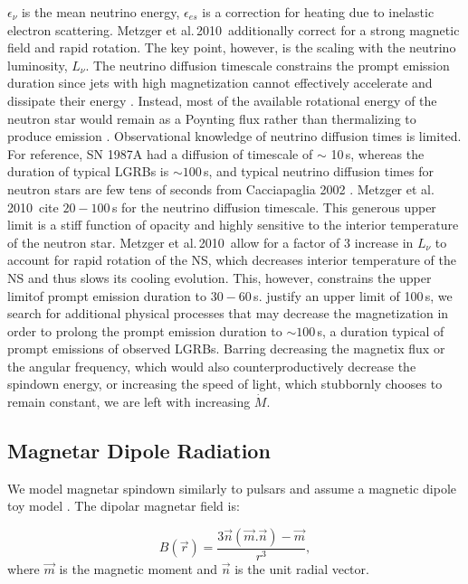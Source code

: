 \documentclass{article}
\begin{document}
$\epsilon_\nu$ is the mean neutrino energy, $\epsilon_{es}$ is a correction for heating due to inelastic electron scattering. Metzger et al.\,2010\,\cite{Metzger:2010pp} additionally  correct for a strong magnetic field and rapid rotation.
The key point, however, is the scaling with the neutrino luminosity, $L_\nu$. The neutrino diffusion timescale constrains the prompt emission duration since jets with high magnetization cannot effectively accelerate and dissipate their energy \cite{Metzger:2010pp}. Instead, most of the available rotational energy of the neutron star would remain as a Poynting flux rather than thermalizing to produce emission \cite{Metzger:2010pp}. Observational knowledge of neutrino diffusion times is limited. For reference, SN 1987A had a diffusion of timescale of $\sim$ 10\,s, whereas the duration of typical LGRBs is $\sim 100$\,s, and typical neutrino diffusion times for neutron stars are few tens of seconds from Cacciapaglia 2002 \cite{Cacciapaglia:2002qr}. Metzger et al.\,2010\,\cite{Metzger:2010pp} cite $20-100$\,s for the neutrino diffusion timescale. This generous upper limit is a stiff function of opacity and highly sensitive to the interior temperature of the neutron star. Metzger et al.\,2010\,\cite{Metzger:2010pp} allow for a factor of 3 increase in $L_\nu$ to account for rapid rotation of the NS, which decreases interior temperature of the NS and thus slows its cooling evolution. This, however, constrains the upper limitof prompt emission duration to $30-60$\,s. justify an upper limit of 100\,s, we search for additional physical processes that may decrease the magnetization in order to prolong the prompt emission duration to $\sim 100$\,s, a duration typical of prompt emissions of observed LGRBs. Barring decreasing the magnetix flux or the angular frequency, which would also counterproductively decrease the spindown energy, or increasing the speed of light, which stubbornly chooses to remain constant,  we are left with increasing $\dot{M}$. 

\subsection{Magnetar Dipole Radiation} \label{sec:dipole}

We model magnetar spindown similarly to pulsars and assume a magnetic dipole toy model \cite{Rosswog:2007ap}. The dipolar magnetar field is:

\begin{equation} B(\vec{r})=\frac{3\vec{n}(\vec{m}.\vec{n})-\vec{m}}{r^3}, \end{equation}
where $\vec{m}$ is the magnetic moment and $\vec{n}$ is the unit radial vector.
\end{document}
